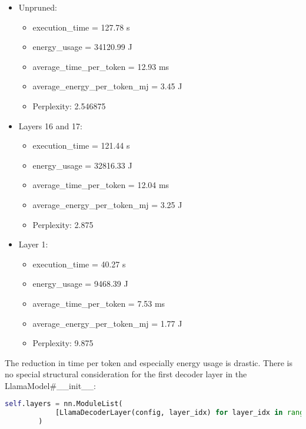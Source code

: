 \documentclass{article}
\begin{document}
    \begin{itemize}
        \item Unpruned:
        \begin{itemize}
            \item execution\_time = 127.78 s
            \item energy\_usage = 34120.99 J
            \item average\_time\_per\_token = 12.93 ms
            \item average\_energy\_per\_token\_mj = 3.45 J
            \item Perplexity: 2.546875
        \end{itemize}

        \item Layers 16 and 17:
        \begin{itemize}
            \item execution\_time = 121.44 s
            \item energy\_usage = 32816.33 J
            \item average\_time\_per\_token = 12.04 ms
            \item average\_energy\_per\_token\_mj = 3.25 J
            \item Perplexity: 2.875
        \end{itemize}

        \item Layer 1:
        \begin{itemize}
            \item execution\_time = 40.27 s
            \item energy\_usage = 9468.39 J
            \item average\_time\_per\_token = 7.53 ms
            \item average\_energy\_per\_token\_mj = 1.77 J
            \item Perplexity: 9.875
        \end{itemize}
    \end{itemize}

    The reduction in time per token and especially energy usage is drastic.
    There is no special structural consideration for the first decoder layer in the LlamaModel\#\_\_init\_\_:

    \begin{lstlisting}[language=Python,label={lst:lstlisting1}]
        self.layers = nn.ModuleList(
            [LlamaDecoderLayer(config, layer_idx) for layer_idx in range(config.num_hidden_layers)]
        )
    \end{lstlisting}
\end{document}
